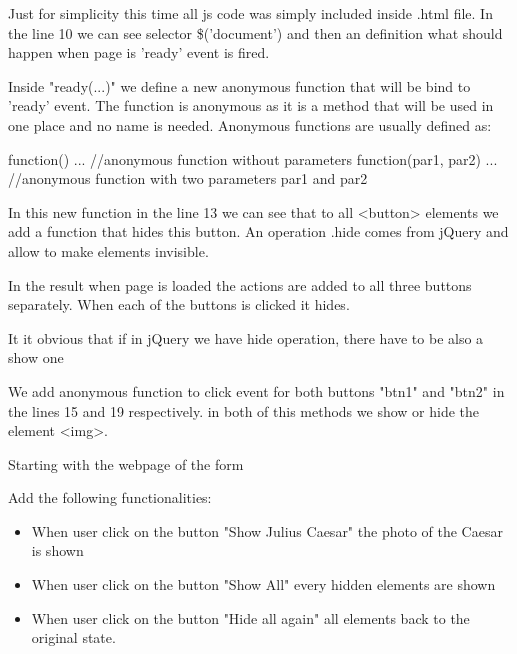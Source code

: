 \begin{explain}
Just for simplicity this time all js code was simply included inside .html file. In the line 10 we can see selector \$('document') and then an definition what should happen when page is 'ready' event is fired.

Inside "ready(...)" we define a new anonymous function that will be bind to 'ready' event. The function is anonymous as it is a method that will be used in one place and no name is needed. Anonymous functions are usually defined as:
\begin{js}
 function() { ...} //anonymous function without parameters
 function(par1, par2) { ...} //anonymous function with two parameters par1 and par2
\end{js}

In this new function in the line 13 we can see that to all <button> elements we add a function that hides this button. An operation .hide comes from jQuery and allow to make elements invisible.


In the result when page is loaded the actions are added to all three buttons separately. When each of the buttons is clicked it hides.


\end{explain}

It it obvious that if in jQuery we have hide operation, there have to be also a show one


\begin{explain}
We add anonymous function to click event for both buttons "btn1" and "btn2" in the lines 15 and 19 respectively. in both of this methods we show or hide the element <img>.
\end{explain}

\begin{extercises}
Starting with the webpage of the form


Add the following functionalities:
\begin{itemize}
\item When user click on the button "Show Julius Caesar" the photo of the Caesar is shown
\item When user click on the button "Show All" every hidden elements are shown
\item When user click on the button "Hide all again" all elements back to the original state.
\end{itemize}
\end{extercises}

